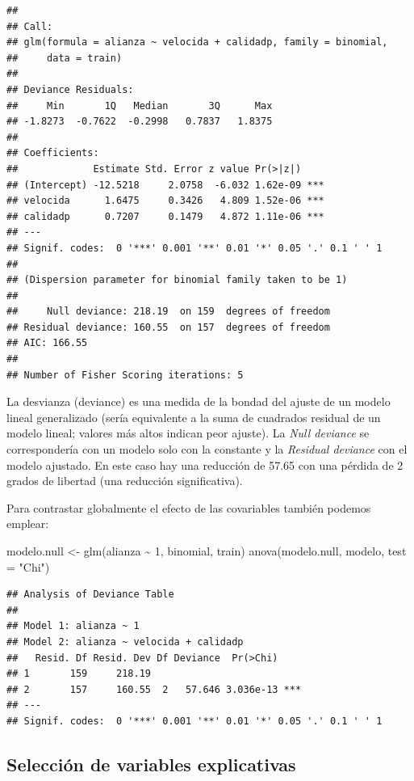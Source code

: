 \documentclass[
  spanish,
]{book}
\newenvironment{Shaded}{\begin{snugshade}}{\end{snugshade}}
\newcommand{\AttributeTok}[1]{\textcolor[rgb]{0.77,0.63,0.00}{#1}}
\newcommand{\DecValTok}[1]{\textcolor[rgb]{0.00,0.00,0.81}{#1}}
\newcommand{\FunctionTok}[1]{\textcolor[rgb]{0.00,0.00,0.00}{#1}}
\newcommand{\NormalTok}[1]{#1}
\newcommand{\OtherTok}[1]{\textcolor[rgb]{0.56,0.35,0.01}{#1}}
\newcommand{\SpecialCharTok}[1]{\textcolor[rgb]{0.00,0.00,0.00}{#1}}
\newcommand{\StringTok}[1]{\textcolor[rgb]{0.31,0.60,0.02}{#1}}
\theoremstyle{break}
\theoremstyle{definition}
\theoremstyle{definition}
\theoremstyle{definition}
\theoremstyle{definition}
\theoremstyle{remark}
\begin{document}
\begin{verbatim}
## 
## Call:
## glm(formula = alianza ~ velocida + calidadp, family = binomial, 
##     data = train)
## 
## Deviance Residuals: 
##     Min       1Q   Median       3Q      Max  
## -1.8273  -0.7622  -0.2998   0.7837   1.8375  
## 
## Coefficients:
##             Estimate Std. Error z value Pr(>|z|)    
## (Intercept) -12.5218     2.0758  -6.032 1.62e-09 ***
## velocida      1.6475     0.3426   4.809 1.52e-06 ***
## calidadp      0.7207     0.1479   4.872 1.11e-06 ***
## ---
## Signif. codes:  0 '***' 0.001 '**' 0.01 '*' 0.05 '.' 0.1 ' ' 1
## 
## (Dispersion parameter for binomial family taken to be 1)
## 
##     Null deviance: 218.19  on 159  degrees of freedom
## Residual deviance: 160.55  on 157  degrees of freedom
## AIC: 166.55
## 
## Number of Fisher Scoring iterations: 5
\end{verbatim}

La desvianza (deviance) es una medida de la bondad del ajuste de un modelo lineal generalizado (sería equivalente a la suma de cuadrados residual de un modelo lineal; valores más altos indican peor ajuste).
La \emph{Null deviance} se correspondería con un modelo solo con la constante y la \emph{Residual deviance} con el modelo ajustado.
En este caso hay una reducción de 57.65 con una pérdida de 2 grados de libertad (una reducción significativa).

Para contrastar globalmente el efecto de las covariables también podemos emplear:

\begin{Shaded}
\begin{Highlighting}[]
\NormalTok{modelo.null }\OtherTok{\textless{}{-}} \FunctionTok{glm}\NormalTok{(alianza }\SpecialCharTok{\textasciitilde{}} \DecValTok{1}\NormalTok{, binomial, train)}
\FunctionTok{anova}\NormalTok{(modelo.null, modelo, }\AttributeTok{test =} \StringTok{"Chi"}\NormalTok{)}
\end{Highlighting}
\end{Shaded}

\begin{verbatim}
## Analysis of Deviance Table
## 
## Model 1: alianza ~ 1
## Model 2: alianza ~ velocida + calidadp
##   Resid. Df Resid. Dev Df Deviance  Pr(>Chi)    
## 1       159     218.19                          
## 2       157     160.55  2   57.646 3.036e-13 ***
## ---
## Signif. codes:  0 '***' 0.001 '**' 0.01 '*' 0.05 '.' 0.1 ' ' 1
\end{verbatim}

\hypertarget{selecciuxf3n-de-variables-explicativas}{%
\subsection{Selección de variables explicativas}\label{selecciuxf3n-de-variables-explicativas}}
\end{document}
